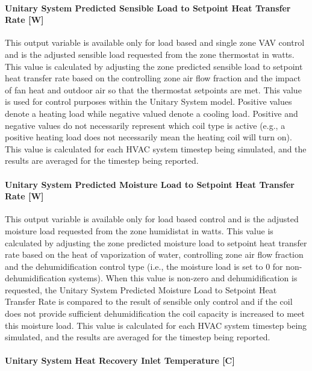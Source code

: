 \paragraph{Unitary System Predicted Sensible Load to Setpoint Heat Transfer Rate {[}W{]}}\label{unitary-system-sensible-load-to-setpoint-heat-transfer-rate-w}

This output variable is available only for load based and single zone VAV control and is the adjusted sensible load requested from the zone thermostat in watts. This value is calculated by adjusting the zone predicted sensible load to setpoint heat transfer rate based on the controlling zone air flow fraction and the impact of fan heat and outdoor air so that the thermostat setpoints are met. This value is used for control purposes within the Unitary System model. Positive values denote a heating load while negative valued denote a cooling load. Positive and negative values do not necessarily represent which coil type is active (e.g., a positive heating load does not necessarily mean the heating coil will turn on). This value is calculated for each HVAC system timestep being simulated, and the results are averaged for the timestep being reported.

\paragraph{Unitary System Predicted Moisture Load to Setpoint Heat Transfer Rate {[}W{]}}\label{unitary-system-predicted-moisture-load-to-setpoint-heat-transfer-rate-w}

This output variable is available only for load based control and is the adjusted moisture load requested from the zone humidistat in watts. This value is calculated by adjusting the zone predicted moisture load to setpoint heat transfer rate based on the heat of vaporization of water, controlling zone air flow fraction and the dehumidification control type (i.e., the moisture load is set to 0 for non-dehumidification systems). When this value is non-zero and dehumidification is requested, the Unitary System Predicted Moisture Load to Setpoint Heat Transfer Rate is compared to the result of sensible only control and if the coil does not provide sufficient dehumidification the coil capacity is increased to meet this moisture load. This value is calculated for each HVAC system timestep being simulated, and the results are averaged for the timestep being reported.


\paragraph{Unitary System Heat Recovery Inlet Temperature {[}C{]}}\label{unitary-system-heat-recovery-inlet-temperature-c}

